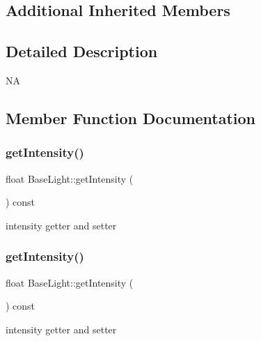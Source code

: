 \subsection*{Additional Inherited Members}


\subsection{Detailed Description}
NA 

\subsection{Member Function Documentation}
\mbox{\label{classBaseLight_a0e3da8811d6c8d3119551fb9b7f83683}} 
\subsubsection{\texorpdfstring{get\+Intensity()}{getIntensity()}\hspace{0.1cm}{\footnotesize\ttfamily [1/2]}}
{\footnotesize\ttfamily float Base\+Light\+::get\+Intensity (\begin{DoxyParamCaption}{ }\end{DoxyParamCaption}) const\hspace{0.3cm}{\ttfamily [inline]}}

intensity getter and setter \mbox{\label{classBaseLight_a0e3da8811d6c8d3119551fb9b7f83683}} 
\subsubsection{\texorpdfstring{get\+Intensity()}{getIntensity()}\hspace{0.1cm}{\footnotesize\ttfamily [2/2]}}
{\footnotesize\ttfamily float Base\+Light\+::get\+Intensity (\begin{DoxyParamCaption}{ }\end{DoxyParamCaption}) const\hspace{0.3cm}{\ttfamily [inline]}}

intensity getter and setter \mbox{\label{classBaseLight_a88a41452d717c2df935359bf82ed5946}} 
